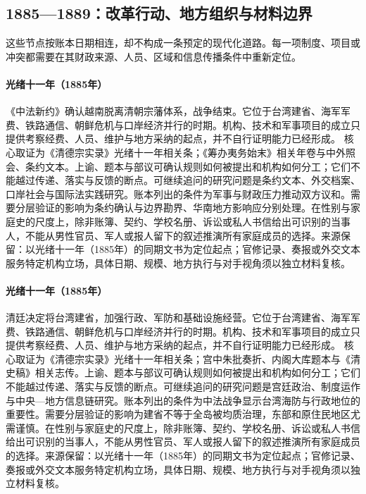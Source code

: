 \subsection{1885—1889：改革行动、地方组织与材料边界}
这些节点按账本日期相连，却不构成一条预定的现代化道路。每一项制度、项目或冲突都需要在其财政来源、人员、区域和信息传播条件中重新定位。
\hypertarget{public:EQ-1885-TIANJIN-CHINA-FRANCE-TREATY}{}\paragraph{光绪十一年（1885年）}《中法新约》确认越南脱离清朝宗藩体系，战争结束。它位于台湾建省、海军军费、铁路通信、朝鲜危机与口岸经济并行的时期。机构、技术和军事项目的成立只提供考察经费、人员、维护与地方采纳的起点，并不自行证明能力已经形成。 核心取证为《清德宗实录》光绪十一年相关条；《筹办夷务始末》相关年卷与中外照会、条约文本。上谕、题本与部议可确认规则如何被提出和机构如何分工；它们不能越过传递、落实与反馈的断点。可继续追问的研究问题是条约文本、外交档案、口岸社会与国际法实践研究。账本列出的条件为军事与财政压力推动双方议和。需要分层验证的影响为条约确认与边界勘界、华南地方影响应分别处理。在性别与家庭史的尺度上，除非账簿、契约、学校名册、诉讼或私人书信给出可识别的当事人，不能从男性官员、军人或报人留下的叙述推演所有家庭成员的选择。来源保留：以光绪十一年（1885年）的同期文书为定位起点；官修记录、奏报或外交文本服务特定机构立场，具体日期、规模、地方执行与对手视角须以独立材料复核。
\hypertarget{public:EQ-1885-TAIWAN-PROVINCE}{}\paragraph{光绪十一年（1885年）}清廷决定将台湾建省，加强行政、军防和基础设施经营。它位于台湾建省、海军军费、铁路通信、朝鲜危机与口岸经济并行的时期。机构、技术和军事项目的成立只提供考察经费、人员、维护与地方采纳的起点，并不自行证明能力已经形成。 核心取证为《清德宗实录》光绪十一年相关条；宫中朱批奏折、内阁大库题本与《清史稿》相关志传。上谕、题本与部议可确认规则如何被提出和机构如何分工；它们不能越过传递、落实与反馈的断点。可继续追问的研究问题是宫廷政治、制度运作与中央—地方信息链研究。账本列出的条件为中法战争显示台湾海防与行政地位的重要性。需要分层验证的影响为建省不等于全岛被均质治理，东部和原住民地区尤需谨慎。在性别与家庭史的尺度上，除非账簿、契约、学校名册、诉讼或私人书信给出可识别的当事人，不能从男性官员、军人或报人留下的叙述推演所有家庭成员的选择。来源保留：以光绪十一年（1885年）的同期文书为定位起点；官修记录、奏报或外交文本服务特定机构立场，具体日期、规模、地方执行与对手视角须以独立材料复核。
